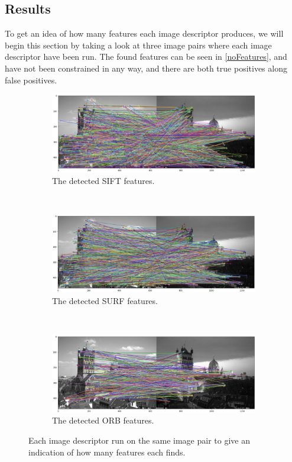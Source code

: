 \subsection{Results}
To get an idea of how many features each image descriptor produces, we will begin this section by taking a look at three image pairs where each image descriptor have been run. The found features can be seen in \autoref{noFeatures}, and have not been constrained in any way, and there are both true positives along false positives.

\begin{figure}[h]
	\centering
	\begin{subfigure}{0.8\linewidth}
		\centering
		\includegraphics[width=\linewidth]{Materials/SIFTMatches}
		\caption{The detected SIFT features.}
	\end{subfigure}
	\\
	\begin{subfigure}{0.8\linewidth}
		\centering
		\includegraphics[width=\linewidth]{Materials/SURFMatches}
		\caption{The detected SURF features.}
	\end{subfigure}
	\\
	\begin{subfigure}{0.8\linewidth}
		\centering
		\includegraphics[width=\linewidth]{Materials/ORBMatches}
		\caption{The detected ORB features.}
	\end{subfigure}
	\caption{Each image descriptor run on the same image pair to give an indication of how many features each finds.}
	\label{noFeatures}
\end{figure}

